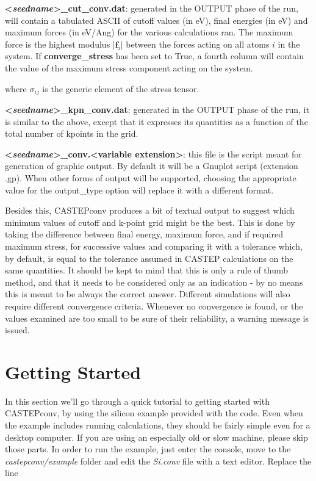 \documentclass[10pt]{article}
\begin{document}
\textbf{\textless \textit{seedname}\textgreater\_cut\_conv.dat}: generated in 
the OUTPUT phase of the run, will contain a tabulated ASCII of cutoff values (in 
eV), final energies (in eV) and maximum forces (in eV/Ang) for the various 
calculations ran. The maximum force is the highest modulus $|\mathbf{f}_i|$ 
between the forces acting on all atoms $i$ in the system. If 
\textbf{converge\_stress} has been set to True, a fourth column will contain the 
value of the maximum stress component acting on the system.

where $\sigma_{ij}$ is the generic element of the stress tensor.

\textbf{\textless \textit{seedname}\textgreater\_kpn\_conv.dat}: generated in 
the OUTPUT phase of the run, it is similar to the above, except that it 
expresses its quantities as a function of the total number of kpoints in the 
grid.

\textbf{\textless \textit{seedname}\textgreater\_conv.\textless variable 
extension\textgreater}: this file is the script meant for generation of graphic 
output. By default it will be a Gnuplot script (extension .gp). When other forms 
of output will be supported, choosing the appropriate value for the output\_type 
option will replace it with a different format.

Besides this, CASTEPconv produces a bit of textual output to suggest which 
minimum values of cutoff and k-point grid might be the best. This is done by 
taking the difference between final energy, maximum force, and if required 
maximum stress, for successive values and comparing it with a tolerance which, 
by default, is equal to the tolerance assumed in CASTEP calculations on the same 
quantities. It should be kept to mind that this is only a rule of thumb method, 
and that it needs to be considered only as an indication - by no means this is 
meant to be always the correct answer. Different simulations will also require 
different convergence criteria. Whenever no convergence is found, or the values 
examined are too small to be sure of their reliability, a warning message is 
issued.

\section{Getting Started}

In this section we'll go through a quick tutorial to getting started with CASTEPconv, by using the silicon example provided with the code. Even when the example includes running calculations, they should be fairly simple even for a desktop computer. If you are using an especially old or slow machine, please skip those parts.\newline
In order to run the example, just enter the console, move to the \textit{castepconv/example} folder and edit the \textit{Si.conv} file with a text editor. Replace the line
\end{document}
